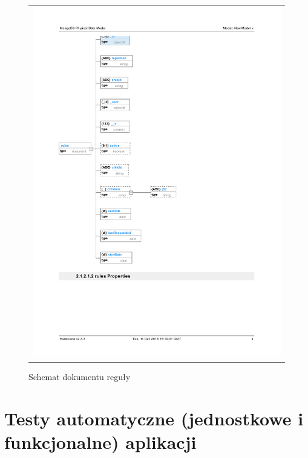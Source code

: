 \documentclass{sprawozdanie-agh}
\begin{document}
			\begin{figure}[H] 
				\centering 
				\begin{tabular}{c}
					\includegraphics[width=.70\textwidth]{rulesDatabase} 
				\end{tabular} 
				\caption{Schemat dokumentu reguły}
			\end{figure}


	\section{Testy automatyczne (jednostkowe i funkcjonalne) aplikacji}
	
\end{document}
